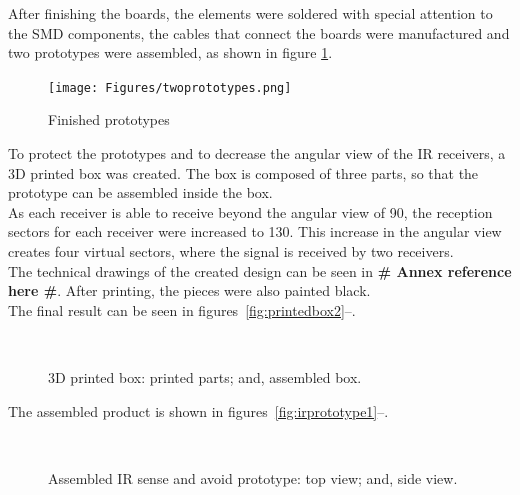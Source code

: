 After finishing the boards, the elements were soldered with special attention to the SMD components, the cables that connect the boards were manufactured and two prototypes were assembled, as shown in figure \ref{fig:twoprototypes}.\\
\begin{figure}[!htb]
  \centering
  \texttt{[image: Figures/twoprototypes.png]}
  \caption[Finished prototypes]{Finished prototypes}
  \label{fig:twoprototypes}
\end{figure}

To protect the prototypes and to decrease the angular view of the IR receivers, a 3D printed box was created. The box is composed of three parts, so that the prototype can be assembled inside the box.\\
As each receiver is able to receive beyond the angular view of 90\degree , the reception sectors for each receiver were increased to 130\degree . This increase in the angular view creates four virtual sectors, where the signal is received by two receivers.\\
The technical drawings of the created design can be seen in \textbf{\# Annex reference here \#}.
After printing, the pieces were also painted black.\\
The final result can be seen in figures~\ref{fig:printedbox2}--.\\

\begin{figure}[!htb]
  \centering
  \hspace{8pt}
  \\
  \caption[3D Printed Box]{3D printed box:
			 printed parts; and,
			 assembled box.}%
  \label{fig:printedbox}%
\end{figure}

The assembled product is shown in figures~\ref{fig:irprototype1}--.\\

\begin{figure}[!htb]
  \centering
  \hspace{8pt}
  \\
  \caption[Assembled IR Sense and Avoid Prototype]{Assembled IR sense and avoid prototype:
			 top view; and,
			 side view.}%
  \label{fig:irprototype}%
\end{figure}

